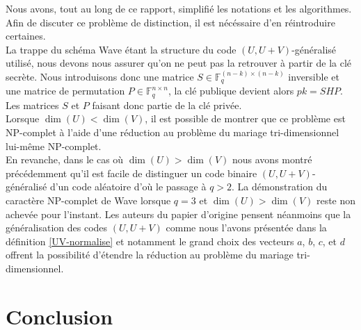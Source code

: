 \documentclass[12pt]{article}
\theoremstyle{plain}
\theoremstyle{definition}
\newcommand{\F}{\mathbb{F}}
\begin{document}
\noindent Nous avons, tout au long de ce rapport, simplifié les notations et les algorithmes. Afin de discuter ce problème de distinction, il est nécéssaire d'en réintroduire certaines. \\
La trappe du schéma Wave étant la structure du code $(U,U+V)$-généralisé utilisé, nous devons nous assurer qu'on ne peut pas la retrouver à partir de la clé secrète. Nous introduisons donc une matrice $S\in\F_q^{(n-k)\times(n-k)}$ inversible et une matrice de permutation $P\in\F_q^{n\times n}$, la clé publique devient alors $pk = SHP$. Les matrices $S$ et $P$ faisant donc partie de la clé privée.\\

\noindent Lorsque $\dim(U) < \dim(V)$, il est possible de montrer que ce problème est NP-complet à l'aide d'une réduction au problème du mariage tri-dimensionnel lui-même NP-complet. \\
En revanche, dans le cas où $\dim(U) > \dim(V)$ nous avons montré précédemment qu'il est facile de distinguer un code binaire $(U,U+V)$-généralisé d'un code aléatoire d'où le passage à $q>2$.
La démonstration du caractère NP-complet de Wave lorsque $q=3$ et $\dim(U) > \dim(V)$ reste non achevée pour l'instant.
Les auteurs du papier d'origine pensent néanmoins que la généralisation des codes $(U,U+V)$ comme nous l'avons présentée dans la définition \ref{UV-normalise} et notamment le grand choix des vecteurs $a$, $b$, $c$, et $d$ offrent la possibilité d'étendre la réduction au problème du mariage tri-dimensionnel.\\

\section*{Conclusion}

\newpage
\end{document}
